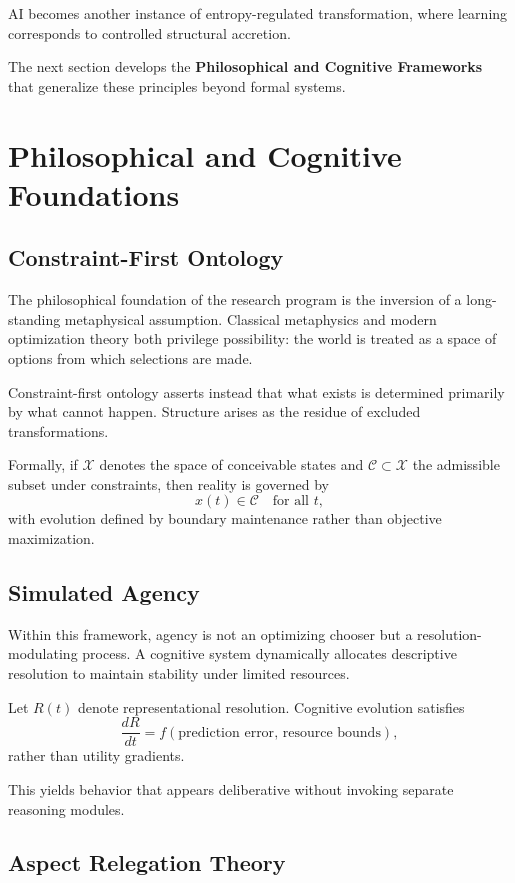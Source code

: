 \documentclass[12pt]{article}
\begin{document}
AI becomes another instance of entropy-regulated transformation, where learning corresponds to controlled structural accretion.

\bigskip

The next section develops the \textbf{Philosophical and Cognitive Frameworks} that generalize these principles beyond formal systems.

\section{Philosophical and Cognitive Foundations}

\subsection{Constraint-First Ontology}

The philosophical foundation of the research program is the inversion of a long-standing metaphysical assumption. Classical metaphysics and modern optimization theory both privilege possibility: the world is treated as a space of options from which selections are made.

Constraint-first ontology asserts instead that what exists is determined primarily by what cannot happen. Structure arises as the residue of excluded transformations.

Formally, if $\mathcal{X}$ denotes the space of conceivable states and $\mathcal{C}\subset\mathcal{X}$ the admissible subset under constraints, then reality is governed by
\[
x(t)\in\mathcal{C}\quad\text{for all }t,
\]
with evolution defined by boundary maintenance rather than objective maximization.

\subsection{Simulated Agency}

Within this framework, agency is not an optimizing chooser but a resolution-modulating process. A cognitive system dynamically allocates descriptive resolution to maintain stability under limited resources.

Let $R(t)$ denote representational resolution. Cognitive evolution satisfies
\[
\frac{dR}{dt}=f(\text{prediction error},\,\text{resource bounds}),
\]
rather than utility gradients.

This yields behavior that appears deliberative without invoking separate reasoning modules.

\subsection{Aspect Relegation Theory}
\end{document}

